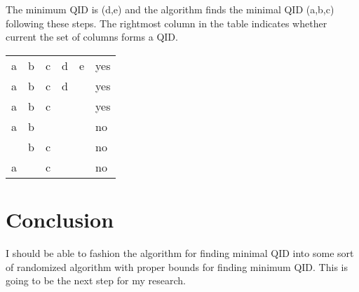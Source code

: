 \documentclass[12pt]{llncs}
\begin{document}
The minimum QID is (d,e) and the algorithm finds the minimal QID (a,b,c) following these steps. The rightmost column in the table indicates whether current the set of columns forms a QID.
\begin{center}
    \begin{tabular}{ | M{3em} | M{3em} | M{3em} | M{3em} | M{3em} | M{3em} | }
    \hline
    a & b & c & d & e & yes\\
    a & b & c & d &   & yes\\
    a & b & c &   &   & yes\\
    a & b &   &   &   & no\\
      & b & c &   &   & no\\
    a &   & c &   &   & no\\
    \hline
    \end{tabular}
\end{center}

\section{Conclusion}
I should be able to fashion the algorithm for finding minimal QID into some sort of randomized algorithm with proper bounds for finding minimum QID. This is going to be the next step for my research.



\end{document}
